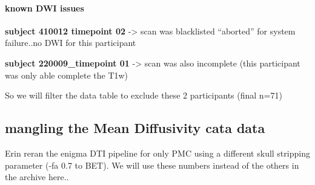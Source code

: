 \documentclass[]{article}
\newenvironment{Shaded}{\begin{snugshade}}{\end{snugshade}}
\newcommand{\KeywordTok}[1]{\textcolor[rgb]{0.13,0.29,0.53}{\textbf{#1}}}
\newcommand{\StringTok}[1]{\textcolor[rgb]{0.31,0.60,0.02}{#1}}
\newcommand{\OperatorTok}[1]{\textcolor[rgb]{0.81,0.36,0.00}{\textbf{#1}}}
\newcommand{\NormalTok}[1]{#1}
\let\oldparagraph\paragraph
\renewcommand{\paragraph}[1]{\oldparagraph{#1}\mbox{}}
\theoremstyle{definition}
\theoremstyle{definition}
\theoremstyle{definition}
\theoremstyle{remark}
\begin{document}
\paragraph{known DWI issues}\label{known-dwi-issues}

\textbf{subject 410012 timepoint 02} -\textgreater{} scan was
blacklisted ``aborted'' for system failure..no DWI for this participant

\textbf{subject 220009\_timepoint 01} -\textgreater{} scan was also
incomplete (this participant was only able complete the T1w)

So we will filter the data table to exclude these 2 participants (final
n=71)

\begin{Shaded}
\end{Shaded}

\subsection{mangling the Mean Diffusivity cata
data}\label{mangling-the-mean-diffusivity-cata-data}

Erin reran the enigma DTI pipeline for only PMC using a different skull
stripping parameter (-fa 0.7 to BET). We will use these numbers instead
of the others in the archive here..
\end{document}
